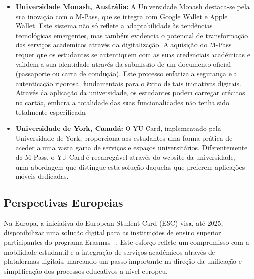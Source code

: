 \documentclass{article}
\begin{document}
\begin{itemize}
    \item \textbf{Universidade Monash, Austrália: }A Universidade Monash destaca-se pela
          sua inovação com o M-Pass, que se integra com Google Wallet e Apple Wallet.
          Este sistema não só reflete a adaptabilidade às tendências tecnológicas
          emergentes, mas também evidencia o potencial de transformação dos
          serviços académicos através da digitalização. A aquisição do M-Pass requer
          que os estudantes se autentiquem com as suas credenciais académicas e
          validem a sua identidade através da submissão de um documento oficial
          (passaporte ou carta de condução). Este processo enfatiza a segurança e a
          autenticação rigorosa, fundamentais para o êxito de tais iniciativas digitais.
          Através da aplicação da universidade, os estudantes podem carregar créditos
          no cartão, embora a totalidade das suas funcionalidades não tenha sido
          totalmente especificada.
    \item \textbf{Universidade de York, Canadá: }O YU-Card, implementado pela Universidade
          de York, proporciona aos estudantes uma forma prática de aceder a uma
          vasta gama de serviços e espaços universitários. Diferentemente do M-Pass,
          o YU-Card é recarregável através do website da universidade, uma
          abordagem que distingue esta solução daquelas que preferem aplicações
          móveis dedicadas.
\end{itemize}

\subsection{Perspectivas Europeias}
Na Europa, a iniciativa do European Student Card (ESC) visa, até 2025,
disponibilizar uma solução digital para as instituições de ensino superior
participantes do programa Erasmus+. Este esforço reflete um compromisso com
a mobilidade estudantil e a integração de serviços académicos através de
plataformas digitais, marcando um passo importante na direção da unificação e
simplificação dos processos educativos a nível europeu.
\end{document}
